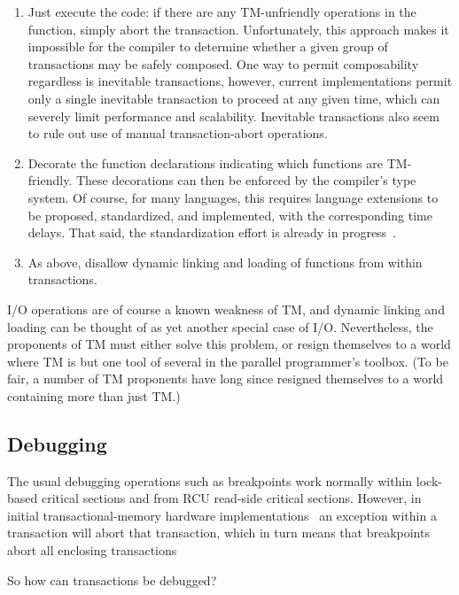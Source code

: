 \begin{enumerate}
\item	Just execute the code: if there are any TM-unfriendly operations
	in the function, simply abort the transaction.
	Unfortunately, this approach makes it impossible for the compiler
	to determine whether a given group of transactions may be safely
	composed.
	One way to permit composability regardless is inevitable
	transactions, however, current implementations permit only a
	single inevitable transaction to proceed at any given time,
	which can severely limit performance and scalability.
	Inevitable transactions also seem to rule out use of manual
	transaction-abort operations.
\item	Decorate the function declarations indicating which functions
	are TM-friendly.
	These decorations can then be enforced by the compiler's type system.
	Of course, for many languages, this requires language extensions
	to be proposed, standardized, and implemented, with the
	corresponding time delays.
	That said, the standardization effort is already in
	progress~\cite{Ali-Reza-Adl-Tabatabai2009CppTM}.
\item	As above, disallow dynamic linking and loading of functions from
	within transactions. 
\end{enumerate}

I/O operations are of course a known weakness of TM, and dynamic linking
and loading can be thought of as yet another special case of I/O.
Nevertheless, the proponents of TM must either solve this problem, or
resign themselves to a world where TM is but one tool of several in the
parallel programmer's toolbox.
(To be fair, a number of TM proponents have long since resigned themselves
to a world containing more than just TM.)

\subsection{Debugging}
\label{sec:future:Debugging}

The usual debugging operations such as breakpoints work normally within
lock-based critical sections and from RCU read-side critical sections.
However, in initial transactional-memory hardware
implementations~\cite{DaveDice2009ASPLOSRockHTM} an exception within
a transaction will abort that transaction, which in turn means that
breakpoints abort all enclosing transactions

So how can transactions be debugged?

